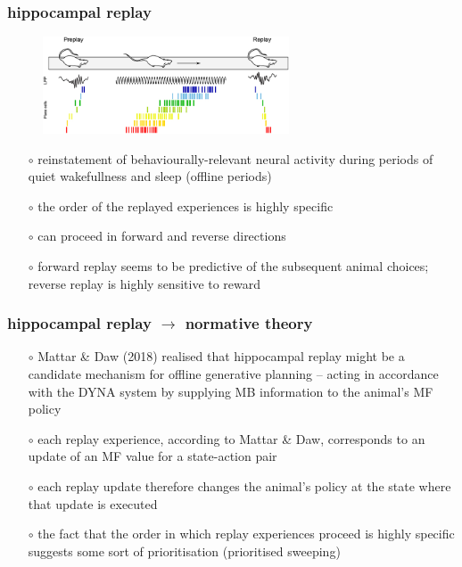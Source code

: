 \documentclass[aspectratio=169]{beamer}
\begin{document}
\begin{frame}
    \frametitle{hippocampal replay}
    \begin{figure}
        \centering
        \includegraphics[width=0.65\textwidth]{replay_eg.jpg}
    \end{figure}
    \hspace*{\fill} {\footnotesize \citet{drieuHippocampalSequencesExploration2019}} 
    \begin{itemize}
        \item[$\circ$] reinstatement of behaviourally-relevant neural activity during periods of quiet wakefullness and sleep (offline periods)
        \item[$\circ$] the order of the replayed experiences is highly specific
        \item[$\circ$] can proceed in forward and reverse directions
        \item[$\circ$] forward replay seems to be predictive of the subsequent animal choices; 
        reverse replay is highly sensitive to reward
    \end{itemize}
\end{frame}

\begin{frame}
    \frametitle{hippocampal replay $\rightarrow$ normative theory}

    \begin{itemize}
        \item[$\circ$] Mattar \& Daw (2018) realised that hippocampal replay might be a candidate mechanism for offline generative planning -- 
        acting in accordance with the DYNA system by supplying MB information to the animal's MF policy
        \item[$\circ$] each replay experience, according to Mattar \& Daw, corresponds to an update of an MF value for a state-action pair 
        \item[$\circ$] each replay update therefore changes the animal's policy at the state where that update is executed
        \item[$\circ$] the fact that the order in which replay experiences proceed is highly specific suggests some sort of prioritisation (prioritised sweeping) 
    \end{itemize}
\end{frame}
\end{document}
